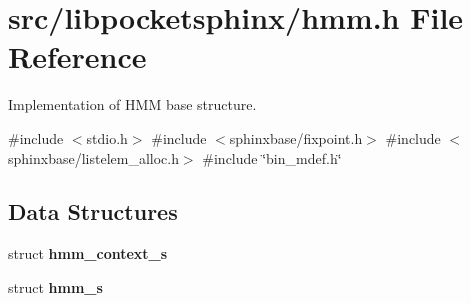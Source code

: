 \section{src/libpocketsphinx/hmm.h File Reference}
\label{hmm_8h}


Implementation of H\+MM base structure.  


{\ttfamily \#include $<$stdio.\+h$>$}\newline
{\ttfamily \#include $<$sphinxbase/fixpoint.\+h$>$}\newline
{\ttfamily \#include $<$sphinxbase/listelem\+\_\+alloc.\+h$>$}\newline
{\ttfamily \#include \char`\"{}bin\+\_\+mdef.\+h\char`\"{}}\newline
\subsection*{Data Structures}
\begin{DoxyCompactItemize}
\item 
struct \textbf{ hmm\+\_\+context\+\_\+s}
\item 
struct \textbf{ hmm\+\_\+s}
\end{DoxyCompactItemize}
